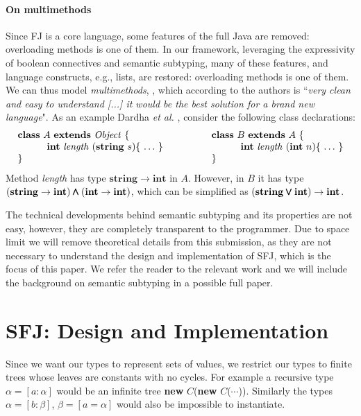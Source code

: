 \documentclass[runningheads]{llncs}
\begin{document}
\paragraph{On multimethods}
Since FJ is a core language, some features of the full Java are removed: overloading methods is one of them.
In our framework, leveraging the expressivity of boolean connectives and semantic subtyping, many of these features, and language constructs, e.g., lists, are restored: overloading methods is one of them. We can thus model \emph{multimethods}, \cite{BC97}, which according to the authors is ``\emph{very clean and easy to understand [...] it would be the best solution for a brand new language}".
As an example Dardha \emph{et al.}  \cite{Dardha2013,Dardha2017}, consider the following class declarations:
$$
\begin{array}{ll}
\mathbf{class} \  A \ \mathbf{extends }\  \mathit{Object}\ \{
&
\qquad
\mathbf{class} \  B \ \mathbf{extends }\  A\ \{
\\
	\qquad\quad \mathbf{int}\ \mathit{length}\ (\mathbf{string}\ s)\{\ \ldots\ \}\qquad
&
	\qquad\qquad\quad \mathbf{int}\ \mathit{length}\ (\mathbf{int}\ n)\{\ \ldots\ \}
\\
\}
&
\qquad \}
\end{array}
$$
Method {\it length} has type $\mathbf{string} \rightarrow \mathbf{int}$ in $A$. However, in $B$ it has type $(\mathbf{string} \rightarrow \mathbf{int}) \pmb{\wedge} (\mathbf{int} \rightarrow \mathbf{int})$,
which can be simplified as $(\mathbf{string} \pmb{\vee} \mathbf{int}) \rightarrow \mathbf{int}$.

The technical developments behind semantic subtyping and its properties are not easy, however, they are completely transparent to the programmer.
Due to space limit we will remove theoretical details from this submission, as they are not necessary to understand the design and implementation of SFJ, which is the focus of this paper. We refer the reader to the relevant work \cite{Dardha2013,Dardha2017} and we will include the background on semantic subtyping in a possible full paper.


\section{SFJ: Design and Implementation}
\label{sec:design}
Since we want our types to represent sets of values, we restrict our types to finite trees whose 
leaves are constants with no cycles. For example a recursive type $\alpha = [a : \alpha]$ would
be an infinite tree \textbf{new} $C$(\textbf{new} $C$($\cdots{}$)). Similarly the types $\alpha = 
[b: \beta]$, $\beta = [a = \alpha]$ would also be impossible to instantiate. 
\end{document}
